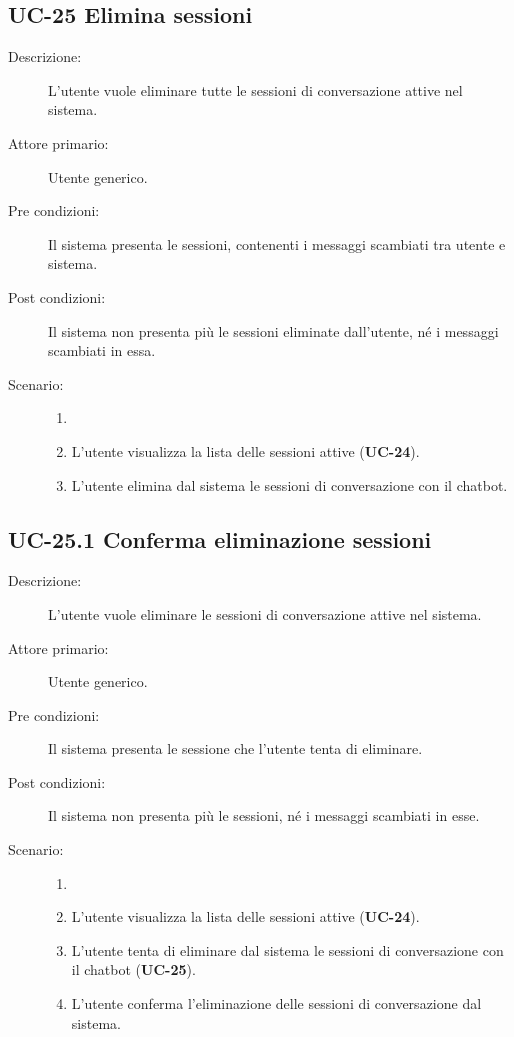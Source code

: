 \subsection{UC-25 Elimina sessioni}
\begin{description}
    \item[Descrizione:] L'utente vuole eliminare tutte le sessioni di conversazione attive nel sistema.
    \item[Attore primario:] Utente generico.
    \item[Pre condizioni:] Il sistema presenta le sessioni, contenenti i messaggi scambiati tra utente e sistema.
    \item[Post condizioni:] Il sistema non presenta più le sessioni eliminate dall'utente, né i messaggi scambiati in essa.
    \item[Scenario:] 
    \begin{enumerate}
        \item[]
        \item L'utente visualizza la lista delle sessioni attive (\textbf{UC-24}).
        \item L'utente elimina dal sistema le sessioni di conversazione con il chatbot.
    \end{enumerate}
\end{description}

\subsection{UC-25.1 Conferma eliminazione sessioni}
\begin{description}
    \item[Descrizione:] L'utente vuole eliminare le sessioni di conversazione attive nel sistema.
    \item[Attore primario:] Utente generico.
    \item[Pre condizioni:] Il sistema presenta le sessione che l'utente tenta di eliminare.
    \item[Post condizioni:] Il sistema non presenta più le sessioni, né i messaggi scambiati in esse.
    \item[Scenario:] 
    \begin{enumerate}
        \item[]
        \item L'utente visualizza la lista delle sessioni attive (\textbf{UC-24}).
        \item L'utente tenta di eliminare dal sistema le sessioni di conversazione con il chatbot (\textbf{UC-25}).
        \item L'utente conferma l'eliminazione delle sessioni di conversazione dal sistema.
    \end{enumerate}
\end{description}

